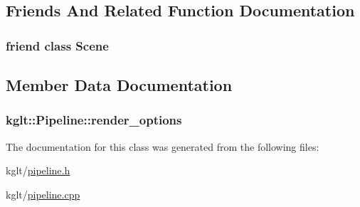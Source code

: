 \subsection{Friends And Related Function Documentation}
\hypertarget{classkglt_1_1_pipeline_a032858ae1fe02d2d1170981c2af2d67c}{
\subsubsection[{Scene}]{\setlength{\rightskip}{0pt plus 5cm}friend class {\bf Scene}\hspace{0.3cm}{\ttfamily [friend]}}}\label{classkglt_1_1_pipeline_a032858ae1fe02d2d1170981c2af2d67c}


\subsection{Member Data Documentation}
\hypertarget{classkglt_1_1_pipeline_a5bdf27ca82b18656b2d979b13bd8deed}{
\subsubsection[{render\-\_\-options}]{ kglt\-::\-Pipeline\-::render\-\_\-options}}\label{classkglt_1_1_pipeline_a5bdf27ca82b18656b2d979b13bd8deed}


The documentation for this class was generated from the following files\-:\begin{DoxyCompactItemize}
\item 
kglt/\hyperlink{pipeline_8h}{pipeline.\-h}\item 
kglt/\hyperlink{pipeline_8cpp}{pipeline.\-cpp}\end{DoxyCompactItemize}

